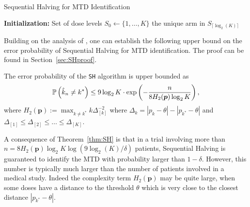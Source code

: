 \begin{algorithm}[H]
\caption{Sequential Halving for MTD Identification}
\label{alg-ST}
\textbf{Initialization:} Set of dose levels $S_0 \leftarrow \{1, \dots, K\}$ \;
\Return the unique arm in  $S_{\lceil{\log_2(K)}\rceil}$ \;
\end{algorithm}


Building on the analysis of \cite{Karnin13}, one can establish the following upper bound on the error probability of Sequential Halving for MTD identification. The proof can be found in Section~\ref{sec:SHproof}. 

\begin{theorem}\label{thm:SH}
The error probability of the \texttt{SH} algorithm is upper bounded as 
\begin{align*}
  \mathbb{P}\left(\hat{k}_n \neq k^*\right) \leq 9 \log_2 K \cdot \exp \left(
  - \frac{n}{8 H_2 (\bm p)\log_2 K}
  \right),
\end{align*}
where $H_2(\bm p):= \max_{k \ne k^*} {k}{\Delta_{[k]}^{-2}}$ where $\Delta_k = |p_k - \theta| - |p_{k^*} - \theta|$ and $\Delta_{[1]} \leq \Delta_{[2]} \leq \dots \leq \Delta_{[K]}$.
\end{theorem}
A consequence of Theorem~\ref{thm:SH} is that in a trial involving more than $n = 8 H_2(\bm p) \log_2 K\log\left(9\log_2(K)/\delta\right)$ patients, Sequential Halving is guaranteed to identify the MTD with probability larger than $1-\delta$. However, this number is typically much larger than the number of patients involved in a medical study. Indeed the complexity term $H_2(\bm p)$ may be quite large, when some doses have a distance to the threshold $\theta$ which is very close to the closest distance $|p_{k^*} - \theta|$. 


